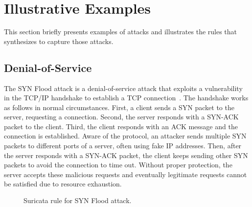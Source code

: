 \documentclass[sigconf,review, anonymous]{acmart}
\begin{document}


\section{Illustrative Examples}
\label{sec:suri-metas-coverage}

This section briefly presents examples of attacks and illustrates the
rules that \tname{} synthesizes to capture those attacks.


\subsection{Denial-of-Service}
\label{sec:dos}

The SYN Flood attack is a denial-of-service attack that exploits a vulnerability in the TCP/IP handshake
to establish a TCP connection~\cite{cloudfare-synflood}. The handshake
works as follows in normal circumstances. First, a client sends a SYN
packet to the server, requesting a connection. Second, the server
responds with a SYN-ACK packet to the client. Third, the client
responds with an ACK message and the connection is established. Aware
of the protocol, an attacker sends multiple SYN packets to different
ports of a server, often using fake IP addresses. Then, after the
server responds with a SYN-ACK packet, the client keeps sending other
SYN packets to avoid the connection to time out. Without proper
protection, the server accepts these malicious requests and eventually
legitimate requests cannot be satisfied due to resource exhaustion.

\begin{figure}[h!]
  
  \caption{Suricata rule for SYN Flood attack.}
  \label{fig:synflood-example}
\end{figure}
\end{document}
